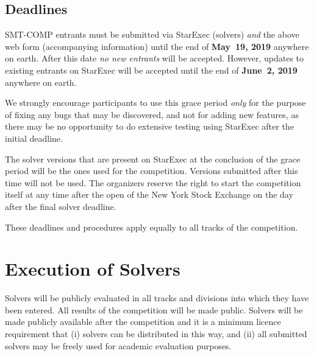 \documentclass[12pt]{article}
\newcommand{\rem}[1]{\textcolor{red}{[#1]}}
\newcommand{\an}[1]{\rem{#1 -- aina}}
\begin{document}

\subsection*{Deadlines}

SMT-COMP entrants must be submitted via StarExec (solvers) \emph{and}
the above web form (accompanying information) until the end of
{\bf May~19, 2019} anywhere on earth.
After this date \emph{no new entrants} will be accepted.
However, updates to existing entrants on StarExec
will be accepted until the end of {\bf June~2, 2019} anywhere on earth.

We strongly encourage participants to use this grace period
\emph{only} for the purpose of fixing any bugs that may be discovered,
and not for adding new features, as there may be no opportunity to do
extensive testing using StarExec after the initial deadline.

The solver versions that are present on StarExec at the conclusion of
the grace period will be the ones used for the competition.  Versions
submitted after this time will not be used.  The organizers reserve
the right to start the competition itself at any time after the open
of the New York Stock Exchange on the day after the final solver
deadline.

These deadlines and procedures apply equally to all tracks of the
competition.




\section{Execution of Solvers}

Solvers will be publicly evaluated in all tracks and divisions into
which they have been entered.  All results of the competition will be
made public. Solvers will be made publicly available after the competition and it is a minimum licence requirement that (i) solvers can be distributed in this way, and (ii) all submitted solvers may be freely used for academic evaluation purposes.

\end{document}
